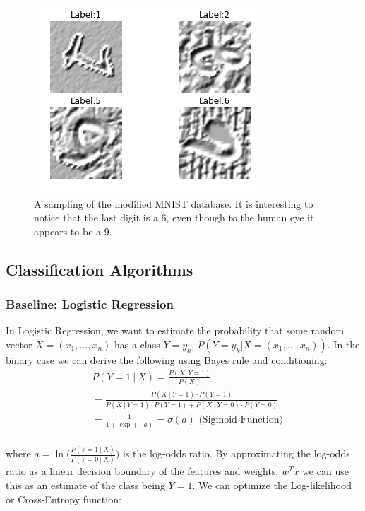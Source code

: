 \documentclass[conference]{IEEEtran}
\begin{document}
\begin{figure}[h]
	\centering
	\includegraphics[scale=0.40]{sample_of_images.png}
	\caption{A sampling of the modified MNIST database. It is interesting to notice that the last digit is a 6, even though to the human eye it appears to be a 9.}
	\label{MNISTSample}
\end{figure}

\subsection{Classification Algorithms}

\subsubsection{Baseline: Logistic Regression}
In Logistic Regression, we want to estimate the probability that some random vector $X=(x_1, \ldots, x_n)$ has a class $Y=y_k$, $P(Y=y_k | X=(x_1, \ldots, x_n))$. In the binary case we can derive the following using Bayes rule and conditioning:
\begin{equation*}
\begin{split}
&P(Y=1~|~X) = \frac{P(X, Y=1)}{P(X)}\\
&= \frac{ P(X~|~Y=1)\cdot P(Y=1) }{ P(X~|~Y=1)\cdot P(Y=1) + P(X~|~Y=0)\cdot P(Y=0) }\\
& = \frac{1}{1 + \exp{(-a)}} = \sigma(a) \text{~(Sigmoid Function)}\\
\end{split}
\end{equation*}

where $a=\ln\Big(\frac{P(Y=1~|~X)}{P(Y=0~|~X)}\Big)$ is the log-odds ratio. By approximating the log-odds ratio as a linear decision boundary of the features and weights, $w^T x$ we can use this as an estimate of the class being $Y=1$. We can optimize the Log-likelihood or Cross-Entropy function:
\end{document}

